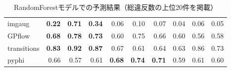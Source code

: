 \documentclass[submit,noauthor,ses,dvipdfmx]{ipsj}
\begin{document}
\begin{table}[t]
{\begin{tabular}{l|rrr|rrr|rrr}
    imgaug & \multicolumn{1}{r|}{\textbf{0.22}} & \multicolumn{1}{r|}{\textbf{0.71}} & \textbf{0.34} & \multicolumn{1}{r|}{0.06} & \multicolumn{1}{r|}{0.10} & 0.07 & \multicolumn{1}{r|}{0.04} & \multicolumn{1}{r|}{0.06} & 0.05 \\
    GPflow & \multicolumn{1}{r|}{\textbf{0.68}} & \multicolumn{1}{r|}{\textbf{0.78}} & \textbf{0.73} & \multicolumn{1}{r|}{0.60} & \multicolumn{1}{r|}{0.75} & 0.66 & \multicolumn{1}{r|}{0.60} & \multicolumn{1}{r|}{0.56} & 0.58 \\
    transitions & \multicolumn{1}{r|}{\textbf{0.83}} & \multicolumn{1}{r|}{\textbf{0.92}} & \textbf{0.87} & \multicolumn{1}{r|}{0.67} & \multicolumn{1}{r|}{0.61} & 0.64 & \multicolumn{1}{r|}{0.63} & \multicolumn{1}{r|}{0.86} & 0.73 \\
    pyphi & \multicolumn{1}{r|}{0.66} & \multicolumn{1}{r|}{0.57} & 0.61 & \multicolumn{1}{r|}{\textbf{0.68}} & \multicolumn{1}{r|}{\textbf{0.74}} & \textbf{0.71} & \multicolumn{1}{r|}{0.59} & \multicolumn{1}{r|}{0.61} & 0.60 \\ \hline
    \end{tabular}
    }
    \vspace{3mm}
    \centering
    \caption{RandomForestモデルでの予測結果（総違反数の上位20件を掲載）}
    \label{tab:RandomForest}
    \vspace{1mm}
\end{table}
\end{document}
